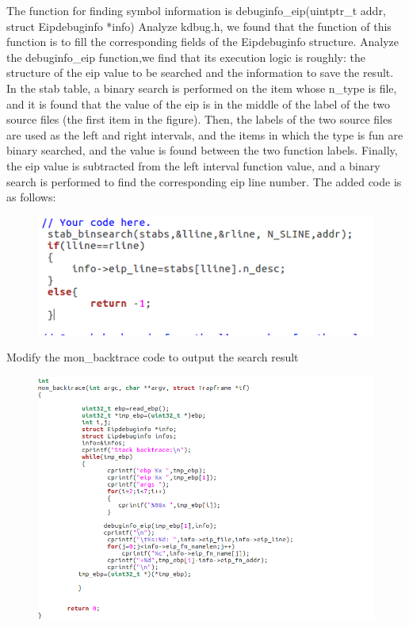 The function for finding symbol information is debuginfo\_eip(uintptr\_t addr, struct Eipdebuginfo *info)
Analyze kdbug.h, we found that the function of this function is to fill the corresponding fields of the Eipdebuginfo structure.
Analyze the debuginfo\_eip function,we find that its execution logic is roughly: the structure of the eip value to be searched and the information to save the result. In the stab table, a binary search is performed on the item whose n\_type is file, and it is found that the value of the eip is in the middle of the label of the two source files (the first item in the figure). Then, the labels of the two source files are used as the left and right intervals, and the items in which the type is fun are binary searched, and the value is found between the two function labels. Finally, the eip value is subtracted from the left interval function value, and a binary search is performed to find the corresponding eip line number.
The added code is as follows:
\begin{figure}[H]
  \centering
  \includegraphics[width=0.8\linewidth]{figure/challenge_2}
\end{figure}


Modify the mon\_backtrace code to output the search result
\begin{figure}[H]
  \centering
  \includegraphics[width=0.8\linewidth]{figure/challenge_3}
\end{figure}


